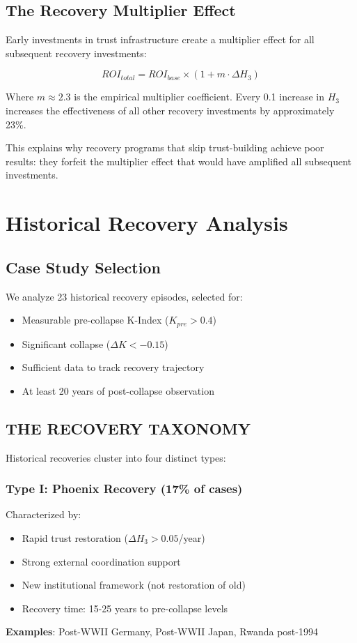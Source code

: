 \documentclass[11pt,letterpaper]{article}
\newcommand{\kindex}{K}
\begin{document}
\subsection{The Recovery Multiplier Effect}

Early investments in trust infrastructure create a multiplier effect for all subsequent recovery investments:

\begin{equation}
ROI_{total} = ROI_{base} \times (1 + m \cdot \Delta H_3)
\label{eq:multiplier}
\end{equation}

Where $m \approx 2.3$ is the empirical multiplier coefficient. Every 0.1 increase in $H_3$ increases the effectiveness of all other recovery investments by approximately 23\%.

This explains why recovery programs that skip trust-building achieve poor results: they forfeit the multiplier effect that would have amplified all subsequent investments.

\section{Historical Recovery Analysis}

\subsection{Case Study Selection}

We analyze 23 historical recovery episodes, selected for:
\begin{itemize}
\item Measurable pre-collapse K-Index ($\kindex_{pre} > 0.4$)
\item Significant collapse ($\Delta \kindex < -0.15$)
\item Sufficient data to track recovery trajectory
\item At least 20 years of post-collapse observation
\end{itemize}

\subsection{THE RECOVERY TAXONOMY}

Historical recoveries cluster into four distinct types:

\subsubsection{Type I: Phoenix Recovery (17\% of cases)}
Characterized by:
\begin{itemize}
\item Rapid trust restoration ($\Delta H_3 > 0.05$/year)
\item Strong external coordination support
\item New institutional framework (not restoration of old)
\item Recovery time: 15-25 years to pre-collapse levels
\end{itemize}
\textbf{Examples}: Post-WWII Germany, Post-WWII Japan, Rwanda post-1994
\end{document}
